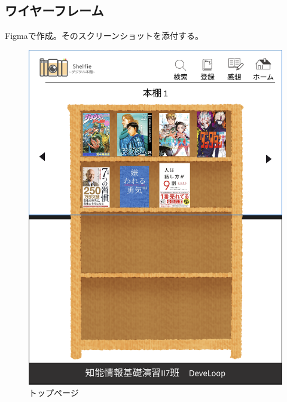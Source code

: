\documentclass[a4paper, 11pt, titlepage]{jsarticle}
\begin{document}
\subsection{ワイヤーフレーム}
Figmaで作成。そのスクリーンショットを添付する。
\begin{figure}[htbp]
\centering
\includegraphics[width=120mm]{toppage.png}
\caption{トップページ}
\label{fig:func}
\end{figure}
\end{document}

